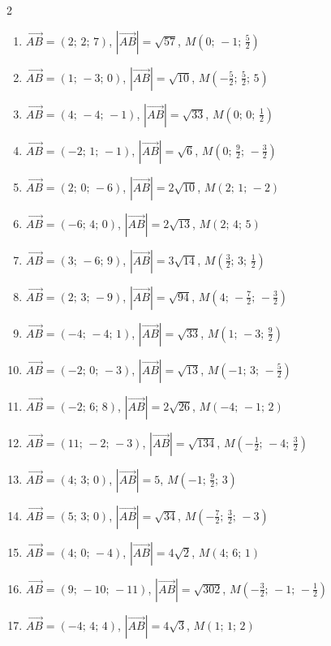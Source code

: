 \begin{multicols}{2}\raggedright
\begin{enumerate}[label=\arabic*., leftmargin=*, itemsep=1pt]
\item $\overrightarrow{AB}=(2;\,2;\,7)$, $|\overrightarrow{AB}|=\sqrt{57}$, $M(0;\,-1;\,\frac{5}{2})$
\item $\overrightarrow{AB}=(1;\,-3;\,0)$, $|\overrightarrow{AB}|=\sqrt{10}$, $M(-\frac{5}{2};\,\frac{5}{2};\,5)$
\item $\overrightarrow{AB}=(4;\,-4;\,-1)$, $|\overrightarrow{AB}|=\sqrt{33}$, $M(0;\,0;\,\frac{1}{2})$
\item $\overrightarrow{AB}=(-2;\,1;\,-1)$, $|\overrightarrow{AB}|=\sqrt{6}$, $M(0;\,\frac{9}{2};\,-\frac{3}{2})$
\item $\overrightarrow{AB}=(2;\,0;\,-6)$, $|\overrightarrow{AB}|=2 \sqrt{10}$, $M(2;\,1;\,-2)$
\item $\overrightarrow{AB}=(-6;\,4;\,0)$, $|\overrightarrow{AB}|=2 \sqrt{13}$, $M(2;\,4;\,5)$
\item $\overrightarrow{AB}=(3;\,-6;\,9)$, $|\overrightarrow{AB}|=3 \sqrt{14}$, $M(\frac{3}{2};\,3;\,\frac{1}{2})$
\item $\overrightarrow{AB}=(2;\,3;\,-9)$, $|\overrightarrow{AB}|=\sqrt{94}$, $M(4;\,-\frac{7}{2};\,-\frac{3}{2})$
\item $\overrightarrow{AB}=(-4;\,-4;\,1)$, $|\overrightarrow{AB}|=\sqrt{33}$, $M(1;\,-3;\,\frac{9}{2})$
\item $\overrightarrow{AB}=(-2;\,0;\,-3)$, $|\overrightarrow{AB}|=\sqrt{13}$, $M(-1;\,3;\,-\frac{5}{2})$
\item $\overrightarrow{AB}=(-2;\,6;\,8)$, $|\overrightarrow{AB}|=2 \sqrt{26}$, $M(-4;\,-1;\,2)$
\item $\overrightarrow{AB}=(11;\,-2;\,-3)$, $|\overrightarrow{AB}|=\sqrt{134}$, $M(-\frac{1}{2};\,-4;\,\frac{3}{2})$
\item $\overrightarrow{AB}=(4;\,3;\,0)$, $|\overrightarrow{AB}|=5$, $M(-1;\,\frac{9}{2};\,3)$
\item $\overrightarrow{AB}=(5;\,3;\,0)$, $|\overrightarrow{AB}|=\sqrt{34}$, $M(-\frac{7}{2};\,\frac{3}{2};\,-3)$
\item $\overrightarrow{AB}=(4;\,0;\,-4)$, $|\overrightarrow{AB}|=4 \sqrt{2}$, $M(4;\,6;\,1)$
\item $\overrightarrow{AB}=(9;\,-10;\,-11)$, $|\overrightarrow{AB}|=\sqrt{302}$, $M(-\frac{3}{2};\,-1;\,-\frac{1}{2})$
\item $\overrightarrow{AB}=(-4;\,4;\,4)$, $|\overrightarrow{AB}|=4 \sqrt{3}$, $M(1;\,1;\,2)$

\end{enumerate}
\end{multicols}
